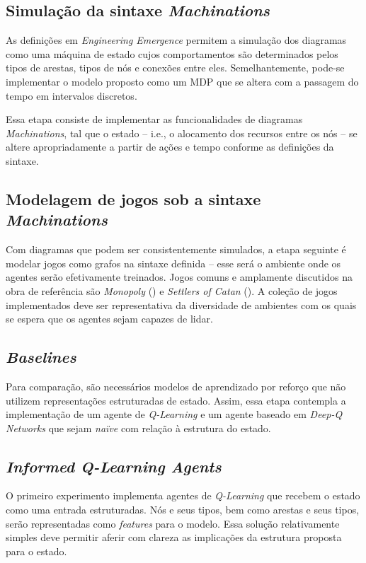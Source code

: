 \documentclass[10pt,a4paper]{article}
\newcommand{\note}[1]{
    \vspace{0.3cm}
    \colorbox{blue!30}{
            \begin{minipage}{0.4\textwidth}
		    \ttfamily \footnotesize
               #1
            \end{minipage}
        }
    \vspace{0.3cm}
}
\begin{document}
\subsection{Simulação da sintaxe \textit{Machinations}}

As definições em \textit{Engineering Emergence} permitem a simulação dos diagramas como uma máquina de estado cujos comportamentos são determinados pelos tipos de arestas, tipos de nós e conexões entre eles. Semelhantemente, pode-se implementar o modelo proposto como um MDP que se altera com a passagem do tempo em intervalos discretos.

Essa etapa consiste de implementar as funcionalidades de diagramas \textit{Machinations}, tal que o estado -- i.e., o alocamento dos recursos entre os nós -- se altere apropriadamente a partir de ações e tempo conforme as definições da sintaxe.

\subsection{Modelagem de jogos sob a sintaxe \textit{Machinations}}

Com diagramas que podem ser consistentemente simulados, a etapa seguinte é modelar jogos como grafos na sintaxe definida -- esse será o ambiente onde os agentes serão efetivamente treinados. Jogos comuns e amplamente discutidos na obra de referência são 
\textit{Monopoly} (\citeyear{monopoly}) e \textit{Settlers of Catan} (\citeyear{catan}). A coleção de jogos implementados deve ser representativa da diversidade de ambientes com os quais se espera que os agentes sejam capazes de lidar.

 \subsection{\textit{Baselines}}
 Para comparação, são necessários modelos de aprendizado por reforço que não utilizem representações estruturadas de estado. Assim, essa etapa contempla a implementação de um agente de \textit{Q-Learning} e um agente baseado em \textit{Deep-Q Networks} que sejam \textit{naïve} com relação à estrutura do estado.

 \subsection{\textit{Informed Q-Learning Agents}}
O primeiro experimento implementa agentes de \textit{Q-Learning} que recebem o estado como uma entrada estruturadas. Nós e seus tipos, bem como arestas e seus tipos, serão representadas como \textit{features} para o modelo. Essa solução relativamente simples deve permitir aferir com clareza as implicações da estrutura proposta para o estado.
\end{document}
